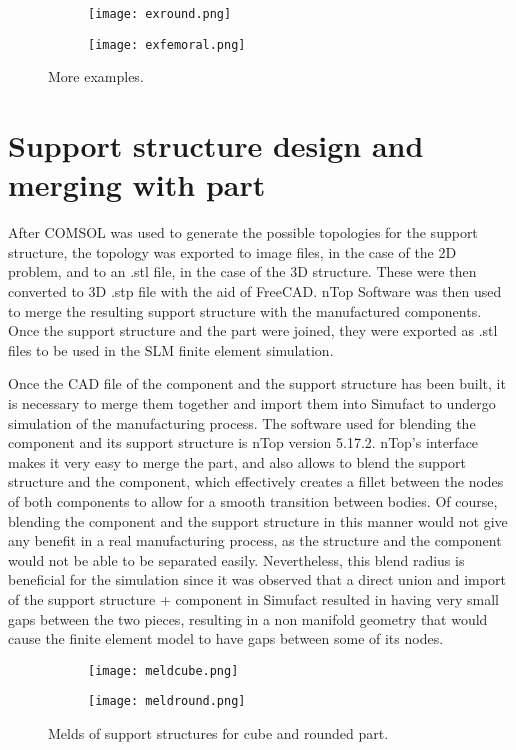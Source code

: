 \documentclass[../main.tex]{subfiles}
\begin{document}
\begin{figure}
  \begin{subfigure}{0.45\textwidth}
    \texttt{[image: exround.png]}
  \end{subfigure}
  \begin{subfigure}{0.45\textwidth}
      \texttt{[image: exfemoral.png]}
    \end{subfigure}
  \caption{More examples.}
\end{figure}

\section{Support structure design and merging with part}

After COMSOL was used to generate the possible topologies for the support structure, the topology was exported to image files, in the case of the 2D problem, and to an .stl file, in the case of the 3D structure. These were then converted to 3D .stp file with the aid of FreeCAD. nTop Software \cite{NTop} was then used to merge the resulting support structure with the manufactured components. Once the support structure and the part were joined, they were exported as .stl files to be used in the SLM finite element simulation.

Once the CAD file of the component and the support structure has been built, it is necessary to merge them together and import them into Simufact to undergo simulation of the manufacturing process. The software used for blending the component and its support structure is nTop version 5.17.2. nTop's interface makes it very easy to merge the part, and also allows to blend the support structure and the component, which effectively creates a fillet between the nodes of both components to allow for a smooth transition between bodies. Of course, blending the component and the support structure in this manner would not give any benefit in a real manufacturing process, as the structure and the component would not be able to be separated easily. Nevertheless, this blend radius is beneficial for the simulation since it was observed that a direct union and import of the support structure + component in Simufact resulted in having very small gaps between the two pieces, resulting in a non manifold geometry that would cause the finite element model to have gaps between some of its nodes.

\begin{figure}
  \begin{subfigure}{0.45\textwidth}
    \texttt{[image: meldcube.png]}
  \end{subfigure}
  \begin{subfigure}{0.45\textwidth}
      \texttt{[image: meldround.png]}
    \end{subfigure}
    \caption{Melds of support structures for cube and rounded part.}
  \end{figure}
\end{document}
